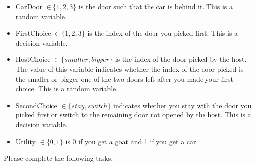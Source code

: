 \documentclass[12pt]{article}
\begin{document}
\begin{itemize}

\item CarDoor $\in \{ 1, 2, 3\}$ is the door such that the car is behind it. This is a random variable.

\item FirstChoice $\in \{1, 2, 3\}$ is the index of the door you picked first. This is a decision variable.

\item HostChoice $\in \{smaller, bigger\}$ is the index of the door picked by the host. The value of this variable indicates whether the index of the door picked is the smaller or bigger one of the two doors left after you made your first choice. This is a random variable.
    
\item SecondChoice $\in \{stay, switch\}$ indicates whether you stay with the door you picked first or switch to the remaining door not opened by the host. This is a decision variable.

\item Utility $\in \{0, 1\}$ is 0 if you get a goat and 1 if you get a car. 

\end{itemize}


Please complete the following tasks.
\end{document}

